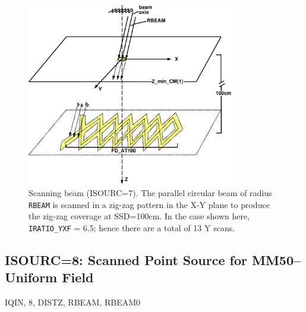 \documentclass[12pt,twoside]{article}
\newcommand{\cen}[1]{\begin{center} #1 \end{center}                   }
\begin{document}
\begin{figure}[htbp]
\leavevmode
\begin{center}
\mbox{}\hspace{0cm}
\includegraphics[height=8cm]{figures/src7}
\caption[ISOURC=7: Scanning sawtooth beam]
{Scanning beam (ISOURC=7).  The parallel circular beam of radius
{\tt RBEAM}
is scanned in a zig-zag pattern in the X-Y plane to produce the zig-zag
coverage at SSD=100cm.  In the case shown here, {\tt IRATIO\_YXF} = 6.5; hence
there are a total of 13 Y scans.}
\label{fig_src7}
\end{center}
\end{figure}

\clearpage
\subsection[ISOURC=8: Scanned Point Source for MM50--Uniform]{ISOURC=8: Scanned Point Source for MM50--Uniform Field}
\cen{IQIN, 8, DISTZ, RBEAM, RBEAM0}
\end{document}
